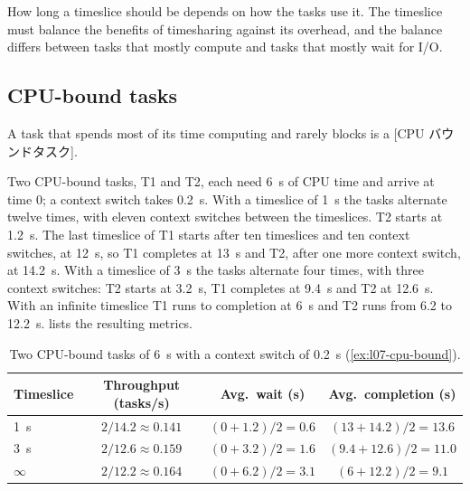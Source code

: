 \documentclass[../main.tex]{subfiles}
\begin{document}
How long a timeslice should be depends on how the tasks use
it.  The timeslice must balance the benefits of timesharing against its
overhead, and the balance differs between tasks that mostly compute and
tasks that mostly wait for I/O.

\subsection{CPU-bound tasks}

A task that spends most of its time computing and rarely blocks is a
[CPU バウンドタスク].

\begin{example}
  \label{ex:l07-cpu-bound}
  Two CPU-bound tasks, T1 and T2, each need \SI{6}{\second} of CPU time and
  arrive at time 0; a context switch takes \SI{0.2}{\second}.  With a
  timeslice of \SI{1}{\second} the tasks alternate twelve times, with eleven
  context switches between the timeslices.  T2 starts at \SI{1.2}{\second}.
  The last timeslice of T1 starts after ten timeslices and ten context
  switches, at \SI{12}{\second}, so T1 completes at \SI{13}{\second} and T2,
  after one more context switch, at \SI{14.2}{\second}.  With a timeslice of \SI{3}{\second}
  the tasks alternate four times, with three context switches: T2 starts
  at \SI{3.2}{\second}, T1 completes at \SI{9.4}{\second} and T2 at
  \SI{12.6}{\second}.  With an infinite timeslice T1 runs to completion at
  \SI{6}{\second} and T2 runs from 6.2 to \SI{12.2}{\second}.
   lists the resulting metrics.
\end{example}

\begin{table}[htbp]
  \centering
  \caption{Two CPU-bound tasks of \SI{6}{\second} with a context switch
    of \SI{0.2}{\second} (\cref{ex:l07-cpu-bound}).}
  \label{tab:l07-cpu-bound}
  \small
  \begin{tabular}{@{}lccc@{}}
    \toprule
    Timeslice & Throughput (tasks/s) & Avg.\ wait (s) & Avg.\ completion (s) \\
    \midrule
    \SI{1}{\second}  & $2/14.2 \approx 0.141$ & $(0+1.2)/2 = 0.6$ & $(13+14.2)/2 = 13.6$ \\
    \SI{3}{\second}  & $2/12.6 \approx 0.159$ & $(0+3.2)/2 = 1.6$ & $(9.4+12.6)/2 = 11.0$ \\
    $\infty$         & $2/12.2 \approx 0.164$ & $(0+6.2)/2 = 3.1$ & $(6+12.2)/2 = 9.1$ \\
    \bottomrule
  \end{tabular}
\end{table}
\end{document}
